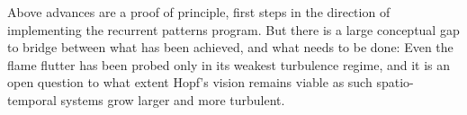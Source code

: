 Above advances are a proof of principle, first steps in the
direction of implementing the recurrent patterns program.
But there is a large conceptual
gap to bridge between what has been achieved, and what needs to be done:
Even the flame flutter has been probed only in its weakest turbulence
regime, and it is an open question to what extent Hopf's vision remains
viable as such spatio-temporal systems grow larger and more turbulent.
